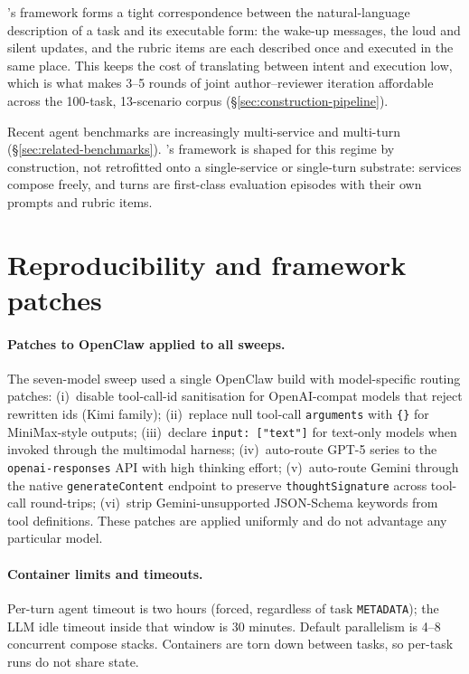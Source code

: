 \bench{}'s framework forms a tight correspondence between the natural-language description of a task and its executable form: the wake-up messages, the loud and silent updates, and the rubric items are each described once and executed in the same place. This keeps the cost of translating between intent and execution low, which is what makes 3--5 rounds of joint author--reviewer iteration affordable across the 100-task, 13-scenario corpus (\S\ref{sec:construction-pipeline}).

Recent agent benchmarks are increasingly multi-service and multi-turn (\S\ref{sec:related-benchmarks}). \bench{}'s framework is shaped for this regime by construction, not retrofitted onto a single-service or single-turn substrate: services compose freely, and turns are first-class evaluation episodes with their own prompts and rubric items.

\section{Reproducibility and framework patches}
\label{app:reproducibility}

\paragraph{Patches to OpenClaw applied to all sweeps.} The seven-model sweep used a single OpenClaw build with model-specific routing patches: (i)~disable tool-call-id sanitisation for OpenAI-compat models that reject rewritten ids (Kimi family); (ii)~replace null tool-call \texttt{arguments} with \texttt{\{\}} for MiniMax-style outputs; (iii)~declare \texttt{input: ["text"]} for text-only models when invoked through the multimodal harness; (iv)~auto-route GPT-5 series to the \texttt{openai-responses} API with high thinking effort; (v)~auto-route Gemini through the native \texttt{generateContent} endpoint to preserve \texttt{thoughtSignature} across tool-call round-trips; (vi)~strip Gemini-unsupported JSON-Schema keywords from tool definitions. These patches are applied uniformly and do not advantage any particular model.

\paragraph{Container limits and timeouts.} Per-turn agent timeout is two hours (forced, regardless of task \texttt{METADATA}); the LLM idle timeout inside that window is 30 minutes. Default parallelism is 4--8 concurrent compose stacks. Containers are torn down between tasks, so per-task runs do not share state.

